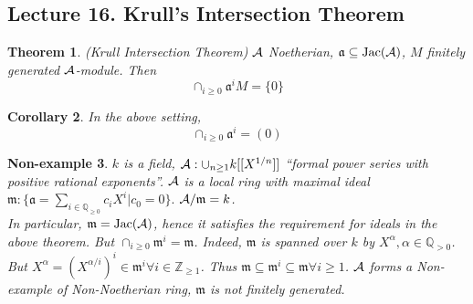 \documentclass[11pt]{article}
\newtheorem{thm}{Theorem}[section]
\newtheorem{cor}[thm]{Corollary}
\newtheorem{nex}[thm]{Non-example}
\newcommand{\intg}{\mathbb Z}
\newcommand{\ratl}{\mathbb Q}
\newcommand{\sca}{{\mathfrak a}}
\newcommand{\scm}{{\mathfrak m}}
\newcommand{\cala}{{\cal A}}
\begin{document}
\subsection{Lecture 16. Krull's Intersection Theorem}

\begin{thm}\label{thm:Krull_intersection}(Krull Intersection Theorem)
$\cala$ Noetherian, $\sca\subseteq \text{Jac}(\cala)$, $M$ finitely generated $\cala$-module.
Then
$$
\cap_{i\geq 0}\sca^i M=\{0\}
$$
\end{thm}
\begin{cor}
In the above setting, 
$$
\cap_{i\geq 0}\sca^i=(0)
$$
\end{cor}
\begin{nex}
$k$ is a field, $\cala:\cup_{n\geq 1}k[[X^{1/n}]]$ ``formal power series with positive rational exponents''. $\cala$ is a local ring with maximal ideal $\scm:\{\sca=\sum_{i\in\ratl_{\geq 0}}c_i X^i|c_0=0\}.$ $\cala/\scm=k$.\\
In particular, $\scm=\text{Jac}(\cala)$, hence it satisfies the requirement for ideals in the above theorem. But $\cap_{i\geq 0}\scm^i=\scm$. Indeed, $\scm$ is spanned over $k$  by $X^\alpha,\alpha\in\ratl_{>0}$. But $X^\alpha=(X^{\alpha/i})^i\in\scm^i\forall i\in\intg_{\geq 1}$. Thus $\scm\subseteq \scm^i\subseteq \scm\forall i\geq 1$. $\cala$ forms a Non-example of Non-Noetherian ring, $\scm$ is not finitely generated. 
\end{nex}
\end{document}

